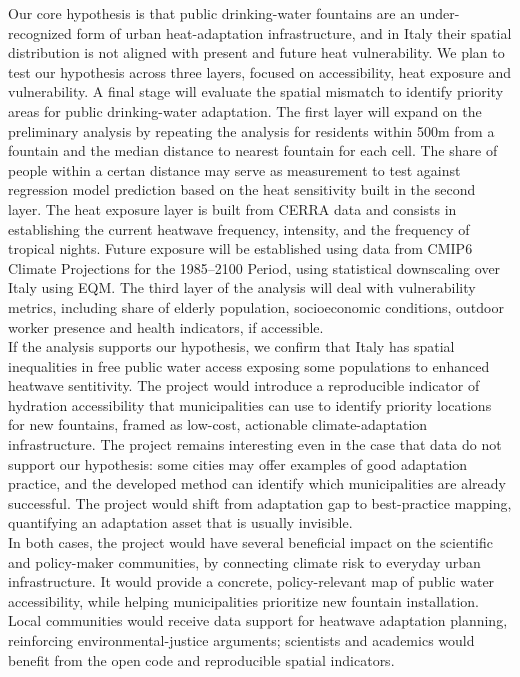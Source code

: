 \documentclass[a4paper,11pt]{article}
\begin{document}
Our core hypothesis is that public drinking-water fountains are an under-recognized form of urban heat-adaptation infrastructure, and in Italy their spatial distribution is not aligned with present and future heat vulnerability. 
We plan to test our hypothesis across three layers, focused on accessibility, heat exposure and vulnerability. 
A final stage will evaluate the spatial mismatch to identify priority areas for public drinking-water adaptation.
The first layer will expand on the preliminary analysis by repeating the analysis for residents within 500m from a fountain and the median distance to nearest fountain for each cell. 
The share of people within a certan distance may serve as measurement to test against regression model prediction based on the heat sensitivity built in the second layer.  
The heat exposure layer is built from CERRA data and consists in establishing the current heatwave frequency, intensity, and the frequency of tropical nights. Future exposure will be established using data from CMIP6 Climate Projections for the 1985–2100 Period, using statistical downscaling over Italy using EQM.
The third layer of the analysis will deal with vulnerability metrics, including share of elderly population, socioeconomic conditions, outdoor worker presence and health indicators, if accessible.\\

If the analysis supports our hypothesis, we confirm that Italy has spatial inequalities in free public water access exposing some populations to enhanced heatwave sentitivity.
The project would introduce a reproducible indicator of hydration accessibility that municipalities can use to identify priority locations for new fountains, framed as low-cost, actionable climate-adaptation infrastructure.
The project remains interesting even in the case that data do not support our hypothesis: some cities may offer examples of good adaptation practice, and the developed method can identify which municipalities are already successful.
The project would shift from adaptation gap to best-practice mapping, quantifying an adaptation asset that is usually invisible.\\

In both cases, the project would have several beneficial impact on the scientific and policy-maker communities, by connecting climate risk to everyday urban infrastructure.
It would provide a concrete, policy-relevant map of public water accessibility, while helping municipalities prioritize new fountain installation.
Local communities would receive data support for heatwave adaptation planning, reinforcing environmental-justice arguments; scientists and academics would benefit from the open code and reproducible spatial indicators.
\end{document}
